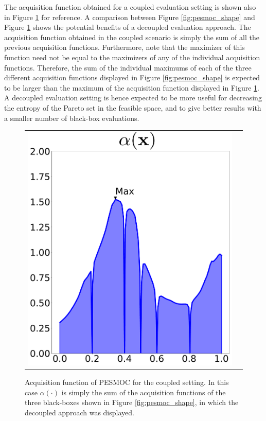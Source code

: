 The acquisition function obtained for a coupled evaluation setting is shown also in
Figure \ref{fig:pesmoc_coupled_shape} for reference. A comparison between Figure
\ref{fig:pesmoc_shape} and Figure \ref{fig:pesmoc_coupled_shape} shows the potential
benefits of a decoupled evaluation approach.
The acquisition function obtained in the coupled scenario is simply the sum of all the previous
acquisition functions. Furthermore, note that the maximizer of this function need not be equal to the
maximizers of any of the individual acquisition functions. Therefore, the sum of the individual maximums of
each of the three different acquisition functions displayed in Figure \ref{fig:pesmoc_shape}
is expected to be larger than the maximum of the acquisition function displayed in Figure \ref{fig:pesmoc_coupled_shape}.
A decoupled evaluation setting is hence expected to be more useful for decreasing the entropy of the
Pareto set in the feasible space, and to give better results with a smaller number of black-box evaluations.

\begin{figure}[t]
\begin{center}
\begin{tabular}{cc}
\includegraphics[width=0.3\linewidth]{Figures/pesmoc/theory/acq.pdf}
\end{tabular}
\caption{Acquisition function of PESMOC for the coupled setting. In this case $\alpha(\cdot)$ is simply the sum
        of the acquisition functions of the three black-boxes shown in Figure \ref{fig:pesmoc_shape}, in which  the decoupled
        approach was displayed. }
        \label{fig:pesmoc_coupled_shape}
\end{center}
\end{figure}

